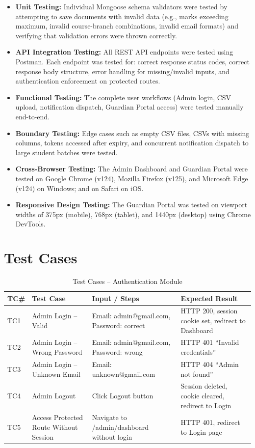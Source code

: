 \documentclass[12pt,a4paper]{report}
\begin{document}
\begin{itemize}
  \item \textbf{Unit Testing:} Individual Mongoose schema validators were tested by attempting to save documents with invalid data (e.g., marks exceeding maximum, invalid course-branch combinations, invalid email formats) and verifying that validation errors were thrown correctly.
  \item \textbf{API Integration Testing:} All REST API endpoints were tested using Postman. Each endpoint was tested for: correct response status codes, correct response body structure, error handling for missing/invalid inputs, and authentication enforcement on protected routes.
  \item \textbf{Functional Testing:} The complete user workflows (Admin login, CSV upload, notification dispatch, Guardian Portal access) were tested manually end-to-end.
  \item \textbf{Boundary Testing:} Edge cases such as empty CSV files, CSVs with missing columns, tokens accessed after expiry, and concurrent notification dispatch to large student batches were tested.
  \item \textbf{Cross-Browser Testing:} The Admin Dashboard and Guardian Portal were tested on Google Chrome (v124), Mozilla Firefox (v125), and Microsoft Edge (v124) on Windows; and on Safari on iOS.
  \item \textbf{Responsive Design Testing:} The Guardian Portal was tested on viewport widths of 375px (mobile), 768px (tablet), and 1440px (desktop) using Chrome DevTools.
\end{itemize}

\section{Test Cases}

\begin{table}[H]
\centering
\caption{Test Cases -- Authentication Module}
\renewcommand{\arraystretch}{1.3}
\begin{tabular}{|p{0.8cm}|p{3cm}|p{4cm}|p{4.5cm}|}
\hline
\textbf{TC\#} & \textbf{Test Case} & \textbf{Input / Steps} & \textbf{Expected Result}\\
\hline
TC1 & Admin Login -- Valid & Email: admin@gmail.com, Password: correct & HTTP 200, session cookie set, redirect to Dashboard\\
\hline
TC2 & Admin Login -- Wrong Password & Email: admin@gmail.com, Password: wrong & HTTP 401 ``Invalid credentials''\\
\hline
TC3 & Admin Login -- Unknown Email & Email: unknown@gmail.com & HTTP 404 ``Admin not found''\\
\hline
TC4 & Admin Logout & Click Logout button & Session deleted, cookie cleared, redirect to Login\\
\hline
TC5 & Access Protected Route Without Session & Navigate to /admin/dashboard without login & HTTP 401, redirect to Login page\\
\hline
\end{tabular}
\end{table}
\end{document}

